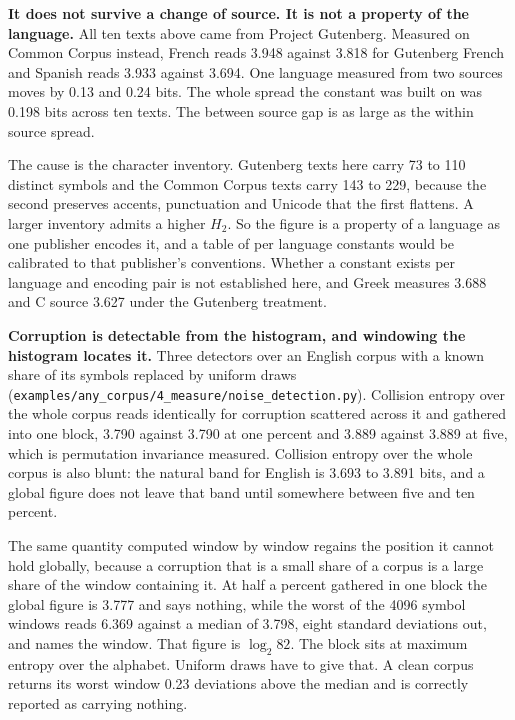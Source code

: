\textbf{It does not survive a change of source. It is not a property of the language.} All ten texts above came from Project Gutenberg. Measured on Common Corpus instead, French reads 3.948 against 3.818 for Gutenberg French and Spanish reads 3.933 against 3.694. One language measured from two sources moves by 0.13 and 0.24 bits. The whole spread the constant was built on was 0.198 bits across ten texts. The between source gap is as large as the within source spread.

The cause is the character inventory. Gutenberg texts here carry 73 to 110 distinct symbols and the Common Corpus texts carry 143 to 229, because the second preserves accents, punctuation and Unicode that the first flattens. A larger inventory admits a higher \(H_2\). So the figure is a property of a language as one publisher encodes it, and a table of per language constants would be calibrated to that publisher's conventions. Whether a constant exists per language and encoding pair is not established here, and Greek measures 3.688 and C source 3.627 under the Gutenberg treatment.

\textbf{Corruption is detectable from the histogram, and windowing the histogram locates it.} Three detectors over an English corpus with a known share of its symbols replaced by uniform draws (\texttt{examples/\allowbreak{}any\_\allowbreak{}corpus/\allowbreak{}4\_\allowbreak{}measure/\allowbreak{}noise\_\allowbreak{}detection.\allowbreak{}py}). Collision entropy over the whole corpus reads identically for corruption scattered across it and gathered into one block, 3.790 against 3.790 at one percent and 3.889 against 3.889 at five, which is permutation invariance measured. Collision entropy over the whole corpus is also blunt: the natural band for English is 3.693 to 3.891 bits, and a global figure does not leave that band until somewhere between five and ten percent.

The same quantity computed window by window regains the position it cannot hold globally, because a corruption that is a small share of a corpus is a large share of the window containing it. At half a percent gathered in one block the global figure is 3.777 and says nothing, while the worst of the 4096 symbol windows reads 6.369 against a median of 3.798, eight standard deviations out, and names the window. That figure is \(\log_2 82\). The block sits at maximum entropy over the alphabet. Uniform draws have to give that. A clean corpus returns its worst window 0.23 deviations above the median and is correctly reported as carrying nothing.

